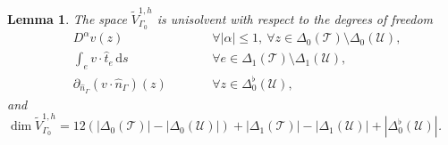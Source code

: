 \documentclass{mcom-l}
\newtheorem{lemma}[theorem]{Lemma}
\theoremstyle{definition}
\theoremstyle{remark}
\numberwithin{equation}{section}
\newcommand{\unitvec}[1]{\hat{#1}}
\renewcommand{\d}[1]{\,\mathrm{d}{#1}}
\newcommand{\mesh}[0]{\mathcal{T}}
\newcommand{\boundarymesh}[0]{\mathcal{U}}
\begin{document}
\begin{lemma}
	\label{lem:min-h1curl-space-dofs-bcs}
	The space $\tilde{V}^{1, h}_{\Gamma_0}$ is unisolvent with respect to the 
	degrees of freedom 
	\begin{subequations}
		\label{eq:min-h1curl-space-dofs-bcs}
		\begin{alignat}{2}
			&D^{\alpha} v(z) \qquad 
			& &\forall |\alpha| \leq 1, \ \forall z \in \Delta_0(\mesh) 
			\setminus \Delta_0(\boundarymesh), \\
			&\int_e v \cdot \unitvec{t}_e \d{s} \qquad 
			& &\forall e \in \Delta_1(\mesh) \setminus \Delta_1(\boundarymesh), 
			\\ 
			&\partial_{\unitvec{n}_{\Gamma}} (v \cdot \unitvec{n}_{\Gamma})(z) 
			\qquad 
			& &\forall z \in \Delta_0^{\flat}(\boundarymesh),
		\end{alignat}
	\end{subequations}
	and $\dim \tilde{V}^{1, h}_{\Gamma_0} = 
	12(|\Delta_0(\mesh)| - |\Delta_0(\boundarymesh)|)
	+ |\Delta_1(\mesh)| - |\Delta_1(\boundarymesh)|
	+ |\Delta_0^{\flat}(\boundarymesh)|$.
\end{lemma}
\end{document}
